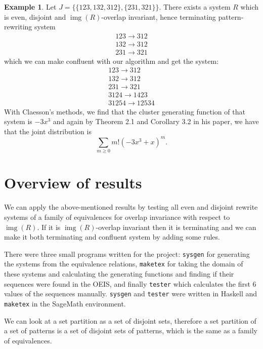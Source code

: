 \documentclass[a4paper, 11pt, english]{article}
\newcommand{\patternrule}{ \to \!}
\theoremstyle{definition}
\newtheorem{example}[theorem]{Example}
\DeclareMathOperator{\img}{img}
\begin{document}
\begin{example}
Let $J = \{ \{ 123, 132, 312 \}, \{ 231, 321 \} \}$. There exists a system $R$ which is even,
disjoint and $\img(R)$-overlap invariant, hence terminating pattern-rewriting system
\[
    \begin{matrix}
        123 \patternrule 312 \\
        132 \patternrule 312 \\
        231 \patternrule 321
    \end{matrix}
\]
which we can make confluent with our algorithm and get the system:
\[
    \begin{matrix}
        123 \patternrule 312 \\
        132 \patternrule 312 \\
        231 \patternrule 321 \\
        3124 \patternrule 1423 \\
        31254 \patternrule 12534
    \end{matrix}
\]
With Claesson's methods, we find that the cluster generating function of that system is $-3x^3$ and
again by Theorem 2.1 and Corollary 3.2 in his paper, we have that the joint distribution is
\[
  \sum_{m \geq 0} m! (-3x^3 + x)^m.
\]

\end{example}

\section{Overview of results}
We can apply the above-mentioned results by testing all even and disjoint rewrite systems of a
family of equivalences for overlap invariance with respect to $\img(R)$. If it is $\img(R)$-overlap invariant
then it is terminating and we can make it both terminating and confluent system by adding some rules.

There were three small programs \cite{hartjenstein:2021} written for the project: \verb|sysgen| for generating the
systems from the equivalence relations, \verb|maketex| for taking the domain of these
systems and calculating the generating functions and finding if their sequences
were found in the OEIS, and finally \verb|tester| which calculates the first 6 values
of the sequences manually. \verb|sysgen| and \verb|tester| were written in Haskell and
\verb|maketex| in the SageMath environment. 

We can look at a set partition as a set of disjoint sets, therefore a set partition of a set of
patterns is a set of disjoint sets of patterns, which is the same as a family of
equivalences.
\end{document}
